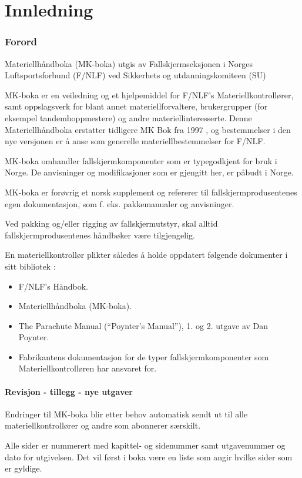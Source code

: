 \part{Innledning}

\section{Forord}
Materiellhåndboka (MK-boka) utgis av Fallskjermseksjonen i Norges Luftsportsforbund (F/NLF) ved Sikkerhets og utdanningskomiteen (SU)

MK-boka er en veiledning og et hjelpemiddel for F/NLF's Materiellkontrollører, samt oppslagsverk for blant annet materiellforvaltere, brukergrupper (for eksempel tandemhoppmestere) og andre materiellinteresserte. Denne Materiellhåndboka erstatter tidligere MK Bok fra 1997 , og bestemmelser i den nye versjonen er å anse som generelle materiellbestemmelser for F/NLF.

MK-boka omhandler fallskjermkomponenter som er typegodkjent for bruk i Norge. De anvisninger og modifikasjoner som er gjengitt her, er påbudt i Norge.

MK-boka er forøvrig et norsk supplement og refererer til fallskjermprodusentenes egen dokumentasjon, som f. eks. pakkemanualer og anvisninger.

Ved pakking og/eller rigging av fallskjermutstyr, skal alltid fallskjermprodusentenes håndbøker være tilgjengelig.

En materiellkontrollør plikter således å holde oppdatert følgende dokumenter i sitt bibliotek :
\begin{itemize}
	\item F/NLF's Håndbok.
	\item Materiellhåndboka (MK-boka).
	\item The Parachute Manual (``Poynter's Manual''), 1. og 2. utgave av Dan Poynter.
	\item Fabrikantens dokumentasjon for de typer fallskjermkomponenter som Materiellkontrolløren har ansvaret for.
\end{itemize}

\subsection{Revisjon - tillegg - nye utgaver}
Endringer til MK-boka blir etter behov automatisk sendt ut til alle materiellkontrollører og andre som abonnerer særskilt.

Alle sider er nummerert med kapittel- og sidenummer samt utgavenummer og dato for utgivelsen. Det vil først i boka være en liste som angir hvilke sider som er gyldige.

